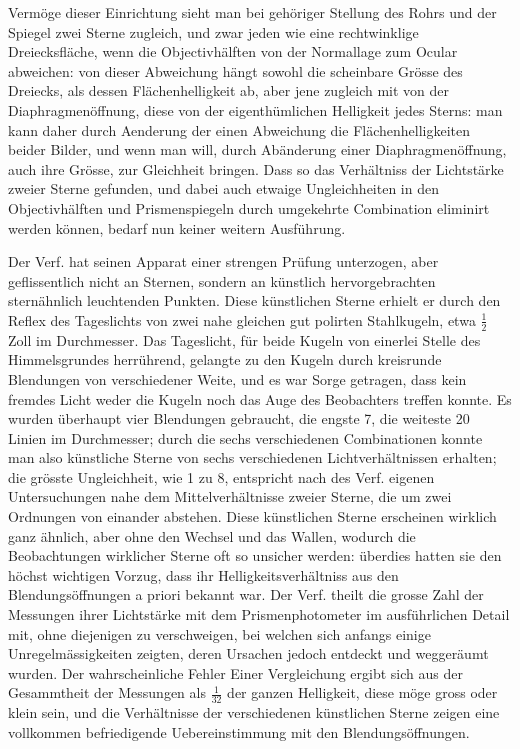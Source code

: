 Vermöge dieser Einrichtung sieht man bei gehöriger Stellung des Rohrs und der Spiegel zwei Sterne
zugleich, und zwar jeden wie eine rechtwinklige Dreiecksfläche, wenn die Objectivhälften von der
Normallage zum Ocular abweichen: von dieser Abweichung hängt sowohl die scheinbare Grösse des
Dreiecks, als dessen Flächenhelligkeit ab, aber jene zugleich mit von der Diaphragmenöffnung, diese
von der eigenthümlichen Helligkeit jedes Sterns: man kann daher durch Aenderung der einen
Abweichung die Flächenhelligkeiten beider Bilder, und wenn man will, durch Abänderung einer
Diaphragmenöffnung, auch ihre Grösse, zur Gleichheit bringen. Dass so das Verhältniss der
Lichtstärke zweier Sterne gefunden, und dabei auch etwaige Ungleichheiten in den Objectivhälften
und Prismenspiegeln durch umgekehrte Combination eliminirt werden können, bedarf nun keiner
weitern Ausführung.

Der Verf. hat seinen Apparat einer strengen Prüfung unterzogen, aber geflissentlich nicht an
Sternen, sondern an künstlich hervorgebrachten sternähnlich leuchtenden Punkten. Diese künstlichen
Sterne erhielt er durch den Reflex des Tageslichts von zwei nahe gleichen gut polirten Stahlkugeln,
etwa $\frac{1}{2}$ Zoll im Durchmesser. Das Tageslicht, für beide Kugeln von einerlei Stelle des
Himmelsgrundes herrührend, gelangte zu den Kugeln durch kreisrunde Blendungen von verschiedener
Weite, und es war Sorge getragen, dass kein fremdes Licht weder die Kugeln noch das Auge des
Beobachters treffen konnte. Es wurden überhaupt vier Blendungen gebraucht, die engste 7, die
weiteste 20 Linien im Durchmesser; durch die sechs verschiedenen Combinationen konnte man also
künstliche Sterne von sechs verschiedenen Lichtverhältnissen erhalten; die grösste Ungleichheit,
wie 1 zu 8, entspricht nach des Verf. eigenen Untersuchungen nahe dem Mittelverhältnisse zweier
Sterne, die um zwei Ordnungen von einander abstehen. Diese künstlichen Sterne erscheinen wirklich
ganz ähnlich, aber ohne den Wechsel und das Wallen, wodurch die Beobachtungen wirklicher Sterne
oft so unsicher werden: überdies hatten sie den höchst wichtigen Vorzug, dass ihr
Helligkeitsverhältniss aus den Blendungsöffnungen a priori bekannt war. Der Verf. theilt die
grosse Zahl der Messungen ihrer Lichtstärke mit dem Prismenphotometer im ausführlichen Detail mit,
ohne diejenigen zu verschweigen, bei welchen sich anfangs einige Unregelmässigkeiten zeigten, deren
Ursachen jedoch entdeckt und weggeräumt wurden. Der wahrscheinliche Fehler Einer Vergleichung
ergibt sich aus der Gesammtheit der Messungen als $\frac{1}{32}$
der ganzen Helligkeit, diese möge gross oder klein sein, und die Verhältnisse der verschiedenen
künstlichen Sterne zeigen eine vollkommen befriedigende Uebereinstimmung mit den
Blendungsöffnungen.

